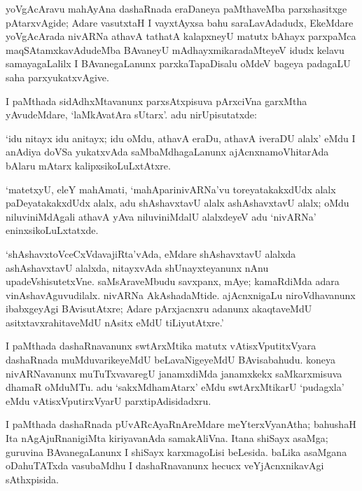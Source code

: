 yoVgAcAravu mahAyAna dashaRnada eraDaneya paMthaveMba parxshasitxge pAtarxvAgide; Adare vasutxtaH I vayxtAyxsa bahu saraLavAdadudx, EkeMdare yoVgAcArada nivARNa athavA tathatA kalapxneyU matutx bAhayx parxpaMca maqSAtamxkavAdudeMba BAvaneyU mAdhayxmikaradaMteyeV idudx kelavu samayagaLalilx I BAvanegaLanunx parxkaTapaDisalu oMdeV bageya padagaLU saha parxyukatxvAgive.

I paMthada sidAdhxMtavanunx parxsAtxpisuva pArxciVna garxMtha yAvudeMdare, `laMkAvatAra sUtarx'. adu nirUpisutatxde:

`idu nitayx idu anitayx; idu oMdu, athavA eraDu, athavA iveraDU alalx' eMdu I anAdiya doVSa yukatxvAda saMbaMdhagaLanunx ajAcnxnamoVhitarAda bAlaru mAtarx kalipxsikoLuLxtAtxre.

`matetxyU, eleY mahAmati, `mahAparinivARNa'vu toreyatakakxdUdx alalx paDeyatakakxdUdx alalx, adu shAshavxtavU alalx ashAshavxtavU alalx; oMdu niluviniMdAgali athavA yAva niluviniMdalU alalxdeyeV adu `nivARNa' eninxsikoLuLxtatxde.

`shAshavxtoVceCxVdavajiRta'vAda, eMdare shAshavxtavU alalxda ashAshavxtavU alalxda, nitayxvAda shUnayxteyanunx nAnu upadeVshisutetxVne. saMsAraveMbudu savxpanx, mAye; kamaRdiMda adara vinAshavAguvudilalx. nivARNa AkAshadaMtide. ajAcnxnigaLu niroVdhavanunx ibabxgeyAgi BAvisutAtxre; Adare pArxjacnxru adanunx akaqtaveMdU asitxtavxrahitaveMdU nAsitx eMdU tiLiyutAtxre.'

I paMthada dashaRnavanunx swtArxMtika matutx vAtisxVputitxVyara dashaRnada muMduvarikeyeMdU beLavaNigeyeMdU BAvisabahudu. koneya nivARNavanunx muTuTxvavaregU janamxdiMda janamxkekx saMkarxmisuva dhamaR oMduMTu. adu `sakxMdhamAtarx' eMdu swtArxMtikarU `pudagxla' eMdu vAtisxVputirxVyarU parxtipAdisidadxru.

\newpage

I paMthada dashaRnada pUvARcAyaRnAreMdare meYterxVyanAtha; bahushaH Ita nAgAjuRnanigiMta kiriyavanAda samakAliVna. Itana shiSayx asaMga; guruvina BAvanegaLanunx I shiSayx karxmagoLisi beLesida. baLika asaMgana oDahuTATxda vasubaMdhu I dashaRnavanunx hecucx veYjAcnxnikavAgi sAthxpisida.

